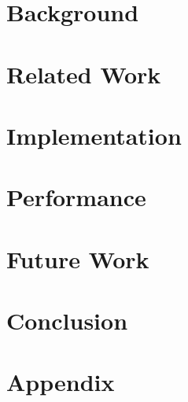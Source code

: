 \documentclass[headsepline,footsepline,footinclude=false,oneside,fontsize=11pt,paper=a4,listof=totoc,bibliography=totoc]{scrbook} %
\begin{document}


\frontmatter{}





\tableofcontents{}

\mainmatter{}




\chapter{Background}




\chapter{Related Work}



\chapter{Implementation}


\chapter{Performance}


\chapter{Future Work}


\chapter{Conclusion}



\appendix
\chapter{Appendix} \label{sec:appendix}

\appendix{}




\listoffigures{}
\renewcommand*{\bibfont}{\raggedright} %
\printbibliography{}
\end{document}
